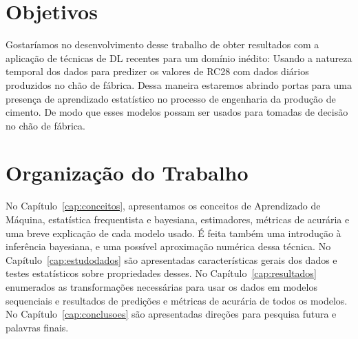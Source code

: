 \section{Objetivos}
\label{sec:objetivo}

Gostaríamos no desenvolvimento desse trabalho de obter resultados com a
aplicação de técnicas de DL recentes para um domínio inédito: Usando a
natureza temporal dos dados para predizer os valores de RC28 com dados diários
produzidos no chão de fábrica. Dessa maneira estaremos abrindo portas para uma presença de aprendizado estatístico no processo de
engenharia da produção de cimento. De modo que esses modelos possam ser usados para tomadas de decisão no chão de fábrica.


\section{Organização do Trabalho}
\label{sec:organizacao_trabalho}

No Capítulo~\ref{cap:conceitos}, apresentamos os conceitos de Aprendizado de
Máquina, estatística frequentista e bayesiana, estimadores, métricas de acurária
e uma breve explicação de cada modelo usado. É feita também uma introdução à inferência
bayesiana, e uma possível aproximação numérica dessa técnica. No
Capítulo~\ref{cap:estudodados} são apresentadas características gerais dos
dados e testes estatísticos sobre propriedades desses. No
Capítulo~\ref{cap:resultados} enumerados as transformações necessárias para usar
os dados em modelos sequenciais e resultados de predições e métricas de
acurária de todos os modelos. No Capítulo~\ref{cap:conclusoes} são apresentadas
direções para pesquisa futura e palavras finais. 



